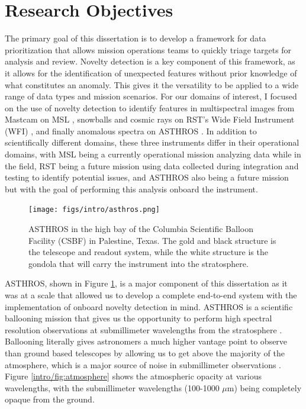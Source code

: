 \section{Research Objectives}
The primary goal of this dissertation is to develop a framework for data prioritization that allows mission operations teams to quickly triage targets for analysis and review.
Novelty detection is a key component of this framework, as it allows for the identification of unexpected features without prior knowledge of what constitutes an anomaly.
This gives it the versatility to be applied to a wide range of data types and mission scenarios.
For our domains of interest, I focused on the use of novelty detection to identify features in multispectral images from Mastcam on MSL \cite{horton2021integrating}, snowballs and cosmic rays on RST's Wide Field Instrument (WFI) \cite{horton2024anomaly}, and finally anomalous spectra on ASTHROS \cite{horton2024board}.
In addition to scientifically different domains, these three instruments differ in their operational domains, with MSL being a currently operational mission analyzing data while in the field, RST being a future mission using data collected during integration and testing to identify potential issues, and ASTHROS also being a future mission but with the goal of performing this analysis onboard the instrument.

\begin{figure}
\centering
\texttt{[image: figs/intro/asthros.png]}
\caption[The Astrophysics Stratospheric Telescope for High Spectral Resolution Observations at Submillimeter-wavelengths (ASTHROS)]{
    ASTHROS in the high bay of the Columbia Scientific Balloon Facility (CSBF) in Palestine, Texas. 
    The gold and black structure is the telescope and readout system, while the white structure is the gondola that will carry the instrument into the stratosphere. 
}
\label{intro/fig:asthros}
\end{figure}

ASTHROS, shown in Figure \ref{intro/fig:asthros}, is a major component of this dissertation as it was at a scale that allowed us to develop a complete end-to-end system with the implementation of onboard novelty detection in mind. 
ASTHROS is a scientific ballooning mission that gives us the opportunity to perform high spectral resolution observations at submillimeter wavelengths from the stratosphere \parencite{siles2020asthros}.
Ballooning literally gives astronomers a much higher vantage point to observe than ground based telescopes by allowing us to get above the majority of the atmosphere, which is a major source of noise in submillimeter observations \cite{yajima2009scientific}.
Figure \ref{intro/fig:atmosphere} shows the atmospheric opacity at various wavelengths, with the submillimeter wavelengths (100-1000 $\mu$m) being completely opaque from the ground.

